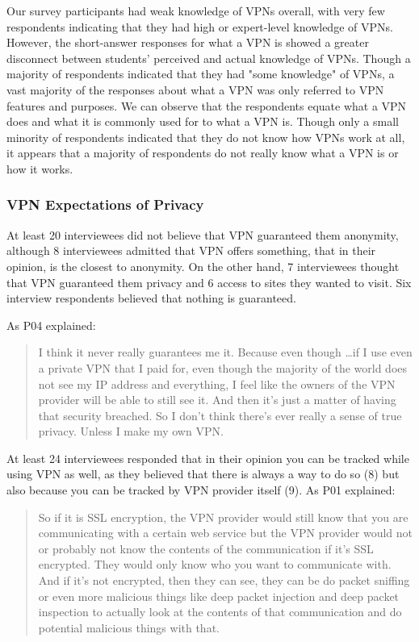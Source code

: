 Our survey participants had weak knowledge of VPNs overall, with very few
respondents indicating that they had high or expert-level knowledge of VPNs.
However, the short-answer responses for what a VPN is showed a greater
disconnect between students’ perceived and actual knowledge of VPNs. Though a
majority of respondents indicated that they had "some knowledge" of VPNs, a
vast majority of the responses about what a VPN was only referred to VPN
features and purposes. We can observe that the respondents equate what a VPN
does and what it is commonly used for to what a VPN is. Though only a small
minority of respondents indicated that they do not know how VPNs work at all,
it appears that a majority of respondents do not really know what a VPN is or
how it works.


\subsubsection{VPN Expectations of Privacy} At least 20 interviewees did not
believe that VPN guaranteed them anonymity, although 8 interviewees admitted
that VPN offers something, that in their opinion, is the closest to anonymity.
On the other hand, 7 interviewees thought that VPN guaranteed them privacy and
6 access to sites they wanted to visit. Six interview respondents believed
that nothing is guaranteed.

As P04 explained: \begin{quote}I think it never really guarantees me it.
Because even though \dots if I use even a private VPN that I paid for, even
though the majority of the world does not see my IP address and everything, I
feel like the owners of the VPN provider will be able to still see it. And
then it's just a matter of having that security breached. So I don't think
there's ever really a sense of true privacy. Unless I make my own
VPN.\end{quote}

At least 24 interviewees responded that in their opinion you can be tracked
while using VPN as well, as they believed that there is always a way to do so
(8) but also because you can be tracked by VPN provider itself (9). 
As P01 explained:

\begin{quote}So if it is SSL encryption, the VPN provider would still know
that you are communicating with a certain web service but the VPN provider
would not or probably not know the contents of the communication if it's SSL
encrypted. They would only know who you want to communicate with. And if it's
not encrypted, then they can see, they can be do packet sniffing or even more
malicious things like deep packet injection and deep packet inspection to
actually look at the contents of that communication and do potential malicious
things with that. \end{quote}

